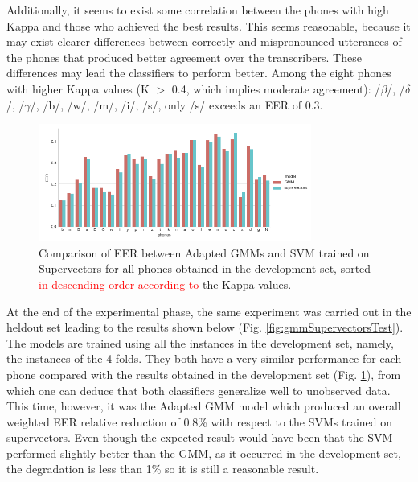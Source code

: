Additionally, it seems to exist some correlation between the phones with high Kappa
and those who achieved
the best results. This seems reasonable, because it may exist clearer differences
between correctly and mispronounced
utterances of the phones that produced better agreement over the transcribers.
These differences may lead the classifiers to perform better.
Among the eight phones with higher Kappa values (K $>$ 0.4, which implies moderate agreement):
/$\beta$/, /$\delta$/, /$\gamma$/, /b/, /w/, /m/, /i/, /s/, only /s/ exceeds an EER of 0.3.

\begin{figure}[H]
	\centering
	\includegraphics[width=0.8\textwidth]{files/figures/results/gmm-vs-supervectors/gmm-vs-supervectors-dev.png}
	\caption{Comparison of EER between Adapted GMMs
	and SVM trained on Supervectors for all phones obtained in the development set, sorted
	\textcolor{red}{in descending order according to} the Kappa values.}
	\label{fig:gmmSupervectorsDev}
\end{figure}

At the end of the experimental phase,
the same experiment was carried out in the heldout set
leading to the results shown below
(Fig. \ref{fig:gmmSupervectorsTest}).
The models are trained using all the instances in the development set, namely, the
instances of the 4 folds.
They both have a very similar performance for each phone compared with the results obtained
in the development set (Fig. \ref{fig:gmmSupervectorsDev}),
from which one can deduce that both classifiers generalize well to
unobserved data. This time, however, it was the Adapted GMM model
which produced an overall weighted EER relative reduction of 0.8\% with respect to the SVMs
trained on supervectors. Even though the expected result would have been that the SVM performed
slightly better than the GMM, as it occurred in the development set,
the degradation is less than 1\% so it is still a reasonable result.

